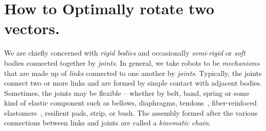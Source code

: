 \chapter{How to Optimally rotate two vectors.}  
 \label{chap:back}
 
 We are chiefly concerned with \textit{rigid bodies} and occasionally \textit{semi-rigid} or \textit{soft} bodies connected together by \textit{joints}.   In general, we take robots to be \textit{mechanisms} that are made up of \textit{links} connected to one another by \textit{joints}.  Typically, the joints connect two or more links and are formed by simple contact with adjacent bodies.  Sometimes, the joints may be flexible -- whether by belt, band, spring or some kind of elastic component such as bellows, diaphragms, tendons~\cite{Bern17ACM}, fiber-reinfoced elastomers~\cite{BishopFREE2012}, resilient pads, strip, or bush. The assembly formed after the various connections between links and joints are called  a \textit{kinematic chain}. 